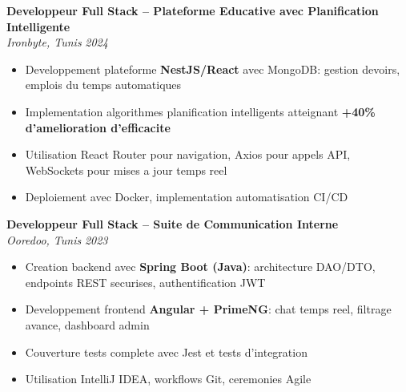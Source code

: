 \documentclass[10pt,a4paper]{article}
\begin{document}
{\vspace{3pt}
\textbf{Developpeur Full Stack -- Plateforme Educative avec Planification Intelligente}\\[1pt]
\textit{Ironbyte, Tunis} \hfill \textit{2024}
\begin{itemize}[leftmargin=12pt,itemsep=2pt,topsep=3pt,parsep=0pt]
  \item Developpement plateforme \textbf{NestJS/React} avec MongoDB: gestion devoirs, emplois du temps automatiques
  \item Implementation algorithmes planification intelligents atteignant \textbf{+40\% d'amelioration d'efficacite}
  \item Utilisation React Router pour navigation, Axios pour appels API, WebSockets pour mises a jour temps reel
  \item Deploiement avec Docker, implementation automatisation CI/CD
\end{itemize}

\vspace{3pt}
\textbf{Developpeur Full Stack -- Suite de Communication Interne}\\[1pt]
\textit{Ooredoo, Tunis} \hfill \textit{2023}
\begin{itemize}[leftmargin=12pt,itemsep=2pt,topsep=3pt,parsep=0pt]
  \item Creation backend avec \textbf{Spring Boot (Java)}: architecture DAO/DTO, endpoints REST securises, authentification JWT
  \item Developpement frontend \textbf{Angular + PrimeNG}: chat temps reel, filtrage avance, dashboard admin
  \item Couverture tests complete avec Jest et tests d'integration
  \item Utilisation IntelliJ IDEA, workflows Git, ceremonies Agile
\end{itemize}

}
\end{document}

